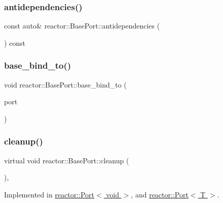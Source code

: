 \subsubsection{\texorpdfstring{antidependencies()}{antidependencies()}}
{\footnotesize\ttfamily const auto\& reactor\+::\+Base\+Port\+::antidependencies (\begin{DoxyParamCaption}{ }\end{DoxyParamCaption}) const\hspace{0.3cm}{\ttfamily [inline]}}

\mbox{\label{classreactor_1_1BasePort_a58886ca9004547c85b06e7803d0530b1}} 
\subsubsection{\texorpdfstring{base\+\_\+bind\+\_\+to()}{base\_bind\_to()}}
{\footnotesize\ttfamily void reactor\+::\+Base\+Port\+::base\+\_\+bind\+\_\+to (\begin{DoxyParamCaption}\item[{\hyperlink{classreactor_1_1BasePort}{Base\+Port} $\ast$}]{port }\end{DoxyParamCaption})\hspace{0.3cm}{\ttfamily [protected]}}

\mbox{\label{classreactor_1_1BasePort_afe81e6747077349da4c420a873783579}} 
\subsubsection{\texorpdfstring{cleanup()}{cleanup()}}
{\footnotesize\ttfamily virtual void reactor\+::\+Base\+Port\+::cleanup (\begin{DoxyParamCaption}{ }\end{DoxyParamCaption})\hspace{0.3cm}{\ttfamily [protected]}, {}}



Implemented in \hyperlink{classreactor_1_1Port_3_01void_01_4_aedf8266554cde75e236451d8c512e4c8}{reactor\+::\+Port$<$ void $>$}, and \hyperlink{classreactor_1_1Port_a05fdfca6fac003412700103e04ee66fd}{reactor\+::\+Port$<$ T $>$}.

